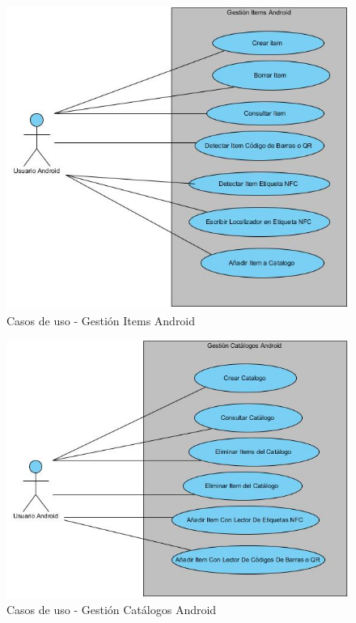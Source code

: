 \documentclass[a4paper,11pt]{book}
\begin{document}
\begin{figure}[H]  
\centering 
\includegraphics[scale=0.50]{imagenes/casosUso/gestion_Items_Android.jpg}
\caption{ Casos de uso - Gestión Items Android\cite{diagrama} }  
\end{figure}

\begin{figure}[H]  
\centering 
\includegraphics[scale=0.50]{imagenes/casosUso/gestion_catalogos_android.jpg}
\caption{ Casos de uso - Gestión Catálogos Android\cite{diagrama}  }  
\end{figure}
\end{document}
